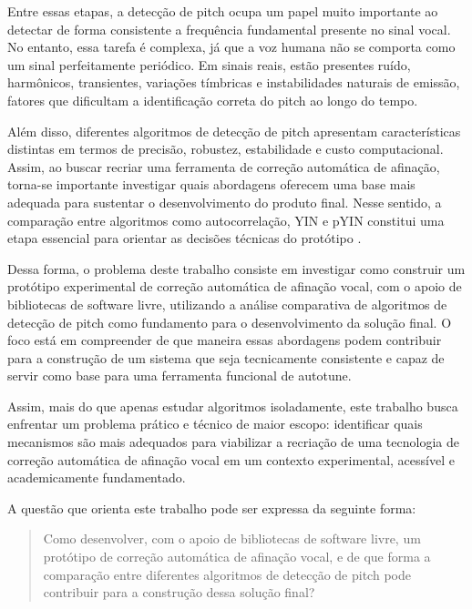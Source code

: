 Entre essas etapas, a detecção de pitch ocupa um papel muito importante ao detectar de forma consistente a frequência fundamental presente no sinal vocal. No entanto, essa tarefa é complexa, já que a voz humana não se comporta como um sinal perfeitamente periódico. Em sinais reais, estão presentes ruído, harmônicos, transientes, variações tímbricas e instabilidades naturais de emissão, fatores que dificultam a identificação correta do pitch ao longo do tempo.

Além disso, diferentes algoritmos de detecção de pitch apresentam características distintas em termos de precisão, robustez, estabilidade e custo computacional. Assim, ao buscar recriar uma ferramenta de correção automática de afinação, torna-se importante investigar quais abordagens oferecem uma base mais adequada para sustentar o desenvolvimento do produto final. Nesse sentido, a comparação entre algoritmos como autocorrelação, YIN e pYIN constitui uma etapa essencial para orientar as decisões técnicas do protótipo \cite{delacuadra2007pitch,decheveigne2002yin,mauch2014pyin}.

Dessa forma, o problema deste trabalho consiste em investigar como construir um protótipo experimental de correção automática de afinação vocal, com o apoio de bibliotecas de software livre, utilizando a análise comparativa de algoritmos de detecção de pitch como fundamento para o desenvolvimento da solução final. O foco está em compreender de que maneira essas abordagens podem contribuir para a construção de um sistema que seja tecnicamente consistente e capaz de servir como base para uma ferramenta funcional de autotune.

Assim, mais do que apenas estudar algoritmos isoladamente, este trabalho busca enfrentar um problema prático e técnico de maior escopo: identificar quais mecanismos são mais adequados para viabilizar a recriação de uma tecnologia de correção automática de afinação vocal em um contexto experimental, acessível e academicamente fundamentado.

A questão que orienta este trabalho pode ser expressa da seguinte forma:

\begin{quote}
Como desenvolver, com o apoio de bibliotecas de software livre, um protótipo de correção automática de afinação vocal, e de que forma a comparação entre diferentes algoritmos de detecção de pitch pode contribuir para a construção dessa solução final?
\end{quote}



